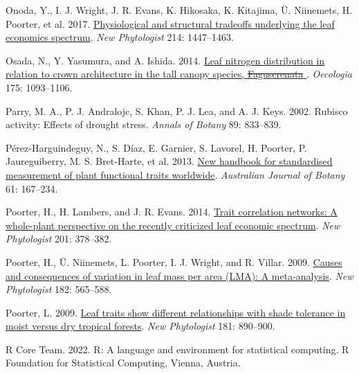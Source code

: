 \documentclass[
  12pt,
  a4paper,
,tablecaptionabove
]{scrartcl}
\newlength{\cslhangindent}
\newenvironment{CSLReferences}[2] %
 {%
  \setlength{\parindent}{0pt}
  \ifodd #1 \everypar{\setlength{\hangindent}{\cslhangindent}}\ignorespaces\fi
  \ifnum #2 > 0
  \setlength{\parskip}{#2\baselineskip}
  \fi
 }%
 {}
\providecommand{\DIFaddtex}[1]{{\protect\color{blue}\uwave{#1}}} %
\providecommand{\DIFdeltex}[1]{{\protect\color{red}\sout{#1}}}                      %
\providecommand{\DIFaddbegin}{} %
\providecommand{\DIFaddend}{} %
\providecommand{\DIFdelbegin}{} %
\providecommand{\DIFdelend}{} %
\providecommand{\DIFadd}[1]{\texorpdfstring{\DIFaddtex{#1}}{#1}} %
\providecommand{\DIFdel}[1]{\texorpdfstring{\DIFdeltex{#1}}{}} %
\begin{document}
\begin{CSLReferences}{1}{0}
\leavevmode{}%
Onoda, Y., I. J. Wright, J. R. Evans, K. Hikosaka, K. Kitajima, Ü. Niinemets, H. Poorter, et al. 2017. \href{https://doi.org/10.1111/nph.14496}{Physiological and structural tradeoffs underlying the leaf economics spectrum}. \emph{New Phytologist} 214: 1447--1463.

\leavevmode{}%
Osada, N., Y. Yasumura, and A. Ishida. 2014. \href{https://doi.org/10.1007/s00442-014-2966-y}{Leaf nitrogen distribution in relation to crown architecture in the tall canopy species, {\DIFdelbegin \DIFdel{Fagus}\DIFdelend \DIFaddbegin \emph{\DIFadd{Fagus}}\DIFaddend }\DIFdelbegin \DIFdel{crenata}\DIFdelend \DIFaddbegin { \emph{\DIFadd{Crenata}}}\DIFaddend }. \emph{Oecologia} 175: 1093--1106.

\leavevmode{}%
Parry, M. A., P. J. Andralojc, S. Khan, P. J. Lea, and A. J. Keys. 2002. Rubisco activity: Effects of drought stress. \emph{Annals of Botany} 89: 833--839.

\leavevmode{}%
Pérez-Harguindeguy, N., S. Díaz, E. Garnier, S. Lavorel, H. Poorter, P. Jaureguiberry, M. S. Bret-Harte, et al. 2013. \href{https://doi.org/10.1071/BT12225}{New handbook for standardised measurement of plant functional traits worldwide}. \emph{Australian Journal of Botany} 61: 167--234.

\leavevmode{}%
Poorter, H., H. Lambers, and J. R. Evans. 2014. \href{https://doi.org/10.1111/nph.12547}{Trait correlation networks: {A} whole-plant perspective on the recently criticized leaf economic spectrum}. \emph{New Phytologist} 201: 378--382.

\leavevmode{}%
Poorter, H., Ü. Niinemets, L. Poorter, I. J. Wright, and R. Villar. 2009. \href{https://doi.org/10.1111/j.1469-8137.2009.02830.x}{Causes and consequences of variation in leaf mass per area ({LMA}): {A} meta-analysis}. \emph{New Phytologist} 182: 565--588.

\leavevmode{}%
Poorter, L. 2009. \href{https://doi.org/10.1111/j.1469-8137.2008.02715.x}{Leaf traits show different relationships with shade tolerance in moist versus dry tropical forests}. \emph{New Phytologist} 181: 890--900.

\leavevmode{}%
R Core Team. 2022. R: {A} language and environment for statistical computing. {R Foundation for Statistical Computing}, {Vienna, Austria}.


\end{CSLReferences}
\end{document}

